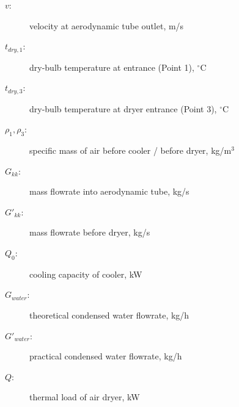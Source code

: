 \begin{description}
    \item[$v$:] velocity at aerodynamic tube outlet, m/s
    \item[$t_{dry,1}$:] dry-bulb temperature at entrance (Point 1), $^\circ$C
    \item[$t_{dry,3}$:] dry-bulb temperature at dryer entrance (Point 3), $^\circ$C
    \item[$\rho_1, \rho_3$:] specific mass of air before cooler / before dryer, kg/m$^3$
    \item[$G_{kk}$:] mass flowrate into aerodynamic tube, kg/s
    \item[$G'_{kk}$:] mass flowrate before dryer, kg/s
    \item[$Q_0$:] cooling capacity of cooler, kW
    \item[$G_{water}$:] theoretical condensed water flowrate, kg/h
    \item[$G'_{water}$:] practical condensed water flowrate, kg/h
    \item[$Q$:] thermal load of air dryer, kW
\end{description}
